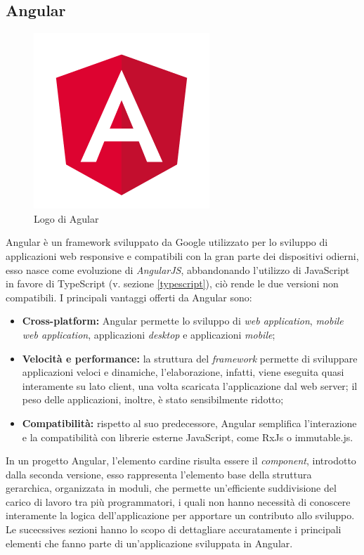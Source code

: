 \subsection{Angular}
\begin{figure}[!h] 
	\centering 
	\includegraphics[width=0.3\columnwidth]{immagini/angular.png} 
	\caption{Logo di Agular}
	\label{figura:angular-1}
\end{figure}
Angular è un framework sviluppato da Google utilizzato per lo sviluppo di applicazioni web responsive e compatibili con la gran parte dei dispositivi odierni, esso nasce come evoluzione di \textit{AngularJS}, abbandonando l'utilizzo di JavaScript in favore di TypeScript (v. sezione \ref{typescript}), ciò rende le due versioni non compatibili.
I principali vantaggi offerti da Angular sono:
\begin{itemize}
	\item \textbf{Cross-platform:} Angular permette lo sviluppo di \textit{web application}, \textit{mobile web application}, applicazioni \textit{desktop} e applicazioni \textit{mobile};
	\item \textbf{Velocità e performance:} la struttura del \textit{framework} permette di sviluppare applicazioni veloci e dinamiche, l'elaborazione, infatti, viene eseguita quasi interamente su lato client, una volta scaricata l'applicazione dal \gls{web server}; il peso delle applicazioni, inoltre, è stato sensibilmente ridotto;
	\item \textbf{Compatibilità:} rispetto al suo predecessore, Angular semplifica l'interazione e la compatibilità con librerie esterne JavaScript, come \gls{RxJs} o \gls{immutable.js}.
\end{itemize}

In un progetto Angular, l'elemento cardine risulta essere il \textit{component}, introdotto dalla seconda versione, esso rappresenta l'elemento base della struttura gerarchica, organizzata in moduli, che permette un'efficiente suddivisione del carico di lavoro tra più programmatori, i quali non hanno necessità di conoscere interamente la logica dell'applicazione per apportare un contributo allo sviluppo.\\
Le sucecssives sezioni hanno lo scopo di dettagliare accuratamente i principali elementi che fanno parte di un'applicazione sviluppata in Angular.


